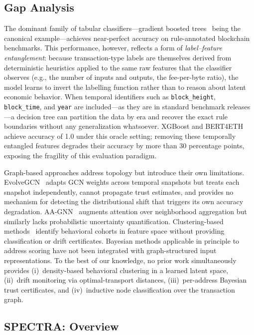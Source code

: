 \subsection*{Gap Analysis}

The dominant family of tabular classifiers---gradient boosted
trees~\cite{Chen2016} being the canonical example---achieves near-perfect
accuracy on rule-annotated blockchain benchmarks.
This performance, however, reflects a form of \emph{label--feature
entanglement}: because transaction-type labels are themselves derived from
deterministic heuristics applied to the same raw features that the classifier
observes (e.g., the number of inputs and outputs, the fee-per-byte ratio),
the model learns to invert the labelling function rather than to reason about
latent economic behavior.
When temporal identifiers such as \texttt{block\_height}, \texttt{block\_time},
and \texttt{year} are included---as they are in standard benchmark releases
---a decision tree can partition the data by era and recover the exact rule
boundaries without any generalization whatsoever.
XGBoost and BERT4ETH~\cite{Hu2023} achieve accuracy of \num{1.0} under
this oracle setting; removing these temporally entangled features degrades
their accuracy by more than \num{30} percentage points, exposing the
fragility of this evaluation paradigm.

Graph-based approaches address topology but introduce their own limitations.
EvolveGCN~\cite{Pareja2020} adapts GCN weights across temporal snapshots
but treats each snapshot independently, cannot propagate trust estimates,
and provides no mechanism for detecting the distributional shift that triggers
its own accuracy degradation.
AA-GNN~\cite{Zhou2020} augments attention over neighborhood aggregation but
similarly lacks probabilistic uncertainty quantification.
Clustering-based methods~\cite{McInnes2017} identify behavioral cohorts in
feature space without providing classification or drift certificates.
Bayesian methods applicable in principle to address scoring
\cite{DeFord2019} have not been integrated with graph-structured input
representations.
To the best of our knowledge, no prior work simultaneously provides
(i)~density-based behavioral clustering in a learned latent space,
(ii)~drift monitoring via optimal-transport distances,
(iii)~per-address Bayesian trust certificates, and
(iv)~inductive node classification over the transaction graph.

\subsection*{SPECTRA: Overview}

